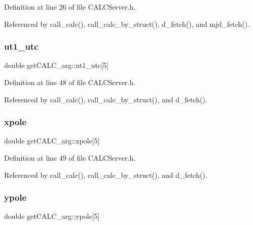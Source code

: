 Definition at line 26 of file C\+A\+L\+C\+Server.\+h.



Referenced by call\+\_\+calc(), call\+\_\+calc\+\_\+by\+\_\+struct(), d\+\_\+fetch(), and mjd\+\_\+fetch().

\mbox{\label{structget_c_a_l_c__arg_a498ae2bafc7f976b0a341d2c0affda1e}} 
\subsubsection{\texorpdfstring{ut1\+\_\+utc}{ut1\_utc}}
{\footnotesize\ttfamily double get\+C\+A\+L\+C\+\_\+arg\+::ut1\+\_\+utc\mbox{[}5\mbox{]}}



Definition at line 48 of file C\+A\+L\+C\+Server.\+h.



Referenced by call\+\_\+calc(), call\+\_\+calc\+\_\+by\+\_\+struct(), and d\+\_\+fetch().

\mbox{\label{structget_c_a_l_c__arg_adb298edd422527a6c28e32d39fa6551a}} 
\subsubsection{\texorpdfstring{xpole}{xpole}}
{\footnotesize\ttfamily double get\+C\+A\+L\+C\+\_\+arg\+::xpole\mbox{[}5\mbox{]}}



Definition at line 49 of file C\+A\+L\+C\+Server.\+h.



Referenced by call\+\_\+calc(), call\+\_\+calc\+\_\+by\+\_\+struct(), and d\+\_\+fetch().

\mbox{\label{structget_c_a_l_c__arg_a5e8dd899a38303a14ae1b311970cb255}} 
\subsubsection{\texorpdfstring{ypole}{ypole}}
{\footnotesize\ttfamily double get\+C\+A\+L\+C\+\_\+arg\+::ypole\mbox{[}5\mbox{]}}



